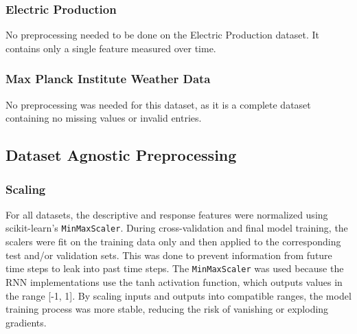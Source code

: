\documentclass[conference]{IEEEtran}
\begin{document}
\subsubsection{\textbf{Electric Production}}
No preprocessing needed to be done on the Electric Production dataset. It contains only a single feature measured over time.

\subsubsection{\textbf{Max Planck Institute Weather Data}}
No preprocessing was needed for this dataset, as it is a complete dataset containing no missing values or invalid entries.

\subsection{\textbf{Dataset Agnostic Preprocessing}}
\subsubsection{\textbf{Scaling}}
For all datasets, the descriptive and response features were normalized using scikit-learn's \texttt{MinMaxScaler}. During cross-validation and final model training, the scalers were fit on the training data only and then applied to the corresponding test and/or validation sets. This was done to prevent information from future time steps to leak into past time steps.
The \texttt{MinMaxScaler} was used because the RNN implementations use the tanh activation function, which outputs values in the range [-1, 1]. By scaling inputs and outputs into compatible ranges, the model training process was more stable, reducing the risk of vanishing or exploding gradients.
\end{document}
